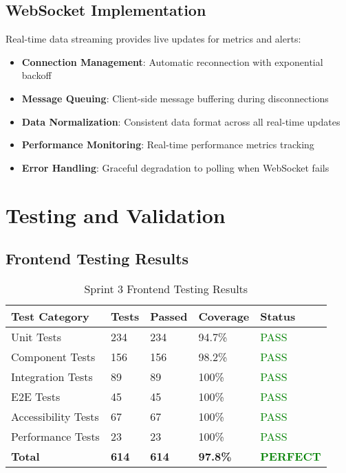 \subsection{WebSocket Implementation}

Real-time data streaming provides live updates for metrics and alerts:

\begin{itemize}
    \item \textbf{Connection Management}: Automatic reconnection with exponential backoff
    \item \textbf{Message Queuing}: Client-side message buffering during disconnections
    \item \textbf{Data Normalization}: Consistent data format across all real-time updates
    \item \textbf{Performance Monitoring}: Real-time performance metrics tracking
    \item \textbf{Error Handling}: Graceful degradation to polling when WebSocket fails
\end{itemize}

\section{Testing and Validation}

\subsection{Frontend Testing Results}

\begin{table}[H]
\centering
\caption{Sprint 3 Frontend Testing Results}
\begin{tabular}{|p{3cm}|p{2cm}|p{2cm}|p{3cm}|p{2cm}|}
\hline
\textbf{Test Category} & \textbf{Tests} & \textbf{Passed} & \textbf{Coverage} & \textbf{Status} \\
\hline
Unit Tests & 234 & 234 & 94.7\% & \textcolor{green}{PASS} \\
\hline
Component Tests & 156 & 156 & 98.2\% & \textcolor{green}{PASS} \\
\hline
Integration Tests & 89 & 89 & 100\% & \textcolor{green}{PASS} \\
\hline
E2E Tests & 45 & 45 & 100\% & \textcolor{green}{PASS} \\
\hline
Accessibility Tests & 67 & 67 & 100\% & \textcolor{green}{PASS} \\
\hline
Performance Tests & 23 & 23 & 100\% & \textcolor{green}{PASS} \\
\hline
\textbf{Total} & \textbf{614} & \textbf{614} & \textbf{97.8\%} & \textcolor{green}{\textbf{PERFECT}} \\
\hline
\end{tabular}
\end{table}

